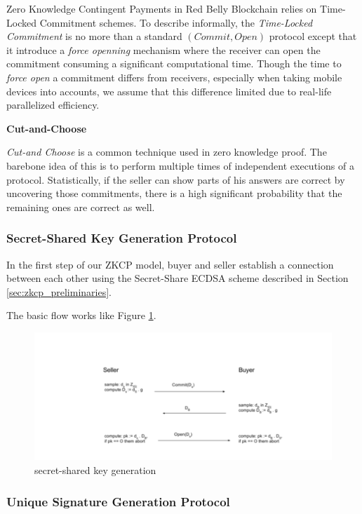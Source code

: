 \documentclass[12pt]{article}
\begin{document}
Zero Knowledge Contingent Payments in Red Belly Blockchain relies on Time-Locked Commitment schemes. To describe informally, the \textit{Time-Locked Commitment} is no more than a standard $(Commit, Open)$ protocol except that it introduce a \textit{force openning} mechanism where the receiver can open the commitment consuming a significant computational time. Though the time to \textit{force open} a commitment differs from receivers, especially when taking mobile devices into accounts, we assume that this difference limited due to real-life parallelized efficiency.

\textbf{Cut-and-Choose}

\textit{Cut-and Choose} is a common technique used in zero knowledge proof. The barebone idea of this is to perform multiple times of independent executions of a protocol. Statistically, if the seller can show parts of his answers are correct by uncovering those commitments, there is a high significant probability that the remaining ones are correct as well. 

\subsubsection{Secret-Shared Key Generation Protocol}
\label{sec:kgen}

In the first step of our ZKCP model, buyer and seller establish a connection between each other using the Secret-Share ECDSA scheme described in Section \ref{sec:zkcp_preliminaries}. 

The basic flow works like Figure \ref{fig:secret_share}.

\begin{figure}
    \centering
    \includegraphics{secret_share.png}
    \caption{secret-shared key generation}
    \label{fig:secret_share}
\end{figure}

\subsubsection{Unique Signature Generation Protocol}
\label{sec:usg}
\end{document}
